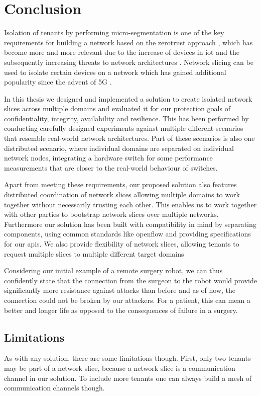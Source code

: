 \chapter{Conclusion}
\label{conclusion}

Isolation of tenants by performing micro-segmentation is one of the key requirements for building a network based on the \gls{zerotrust} approach \cite{zerotrust}, which has become more and more relevant due to the increase of devices in \acrshort{iot} \cite{iotincrease} and the subsequently increasing threats to network architectures \cite{iotthreats}. Network slicing can be used to isolate certain devices on a network which has gained additional popularity since the advent of 5G \cite{5G1, 5G2, 5G3}.

In this thesis we designed and implemented a solution to create isolated network slices across multiple domains and evaluated it for our protection goals of confidentiality, integrity, availability and resilience. This has been performed by conducting carefully designed experiments against multiple different scenarios that resemble real-world network architectures. Part of these scenarios is also one distributed scenario, where individual domains are separated on individual network nodes, integrating a hardware switch for some performance measurements that are closer to the real-world behaviour of switches.

Apart from meeting these requirements, our proposed solution also features distributed coordination of network slices allowing multiple domains to work together without necessarily trusting each other. This enables us to work together with other parties to bootstrap network slices over multiple networks. Furthermore our solution has been built with compatibility in mind by separating components, using common standards like \Gls{openflow} and providing specifications for our \acrshort{api}s. We also provide flexibility of network slices, allowing tenants to request multiple slices to multiple different target domains

Considering our initial example of a remote surgery robot, we can thus confidently state that the connection from the surgeon to the robot would provide significantly more resistance against attacks than before and as of now, the connection could not be broken by our attackers. For a patient, this can mean a better and longer life as opposed to the consequences of failure in a surgery.


\section{Limitations}
As with any solution, there are some limitations though. First, only two tenants may be part of a network slice, because a network slice is a communication channel in our solution. To include more tenants one can always build a mesh of communication channels though.


